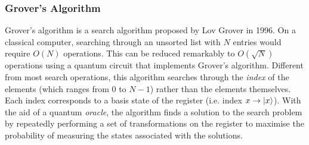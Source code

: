\documentclass[bibliography=totocnumbered, 10pt]{article}
\theoremstyle{NoticeStyle}
\begin{document}
\subsubsection{Grover's Algorithm}
Grover's algorithm is a search algorithm proposed by Lov Grover in 1996. On a classical computer, searching through an unsorted list with $N$ entries would require $O(N)$ operations. This can be reduced remarkably to $O(\sqrt{N})$ operations using a quantum circuit that implements Grover's algorithm. Different from most search operations, this algorithm searches through the \emph{index} of the elements (which ranges from $0$ to $N-1$) rather than the elements themselves. Each index corresponds to a basis state of the register (i.e. index $x \rightarrow {\left\vert{x}\right\rangle}$). With the aid of a quantum \emph{oracle}, the algorithm finds a solution to the search problem by repeatedly performing a set of transformations on the register to maximise the probability of measuring the states associated with the solutions.
\end{document}
